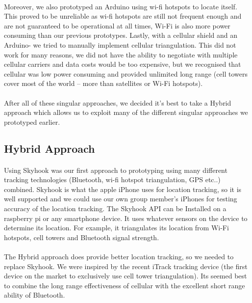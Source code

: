 \documentclass[12pt,a4paper]{article}
\begin{document}
        \paragraph{}
          Moreover, we also prototyped an Arduino using wi-fi hotspots to locate itself. This proved to be unreliable as wi-fi hotspots are still not frequent enough and are not guaranteed to be operational at all times, Wi-Fi is also more power consuming than our previous prototypes. Lastly, with a cellular shield and an Arduino- we tried to manually implement cellular triangulation. This did not work for many reasons, we did not have the ability to negotiate with multiple cellular carriers and data costs would be too expensive, but we recognised that cellular was low power consuming and provided unlimited long range (cell towers cover most of the world – more than satellites or Wi-Fi hotspots).
        \paragraph{}
          After all of these singular approaches, we decided it’s best to take a Hybrid approach which allows us to exploit many of the different singular approaches we prototyped earlier.
      
      \subsection{Hybrid Approach}
        \paragraph{}
          Using Skyhook\cite{SkyhookWireless} was our first approach to prototyping using many different tracking technologies (Bluetooth, wi-fi hotspot triangulation, GPS etc..) combined. Skyhook is what the apple iPhone uses for location tracking, so it is well supported and we could use our own group member's iPhones for testing accuracy of the location tracking. The Skyhook API can be Installed on a raspberry pi or any smartphone device. It uses whatever sensors on the device to determine its location. For example, it triangulates its location from Wi-Fi hotspots, cell towers and Bluetooth signal strength.
        \paragraph{}
          The Hybrid approach does provide better location tracking, so we needed to replace Skyhook. We were inspired by the recent iTrack tracking device (the first device on the market to exclusively use cell tower triangulation). Its seemed best to combine the long range effectiveness of cellular with the excellent short range ability of Bluetooth.
\end{document}
